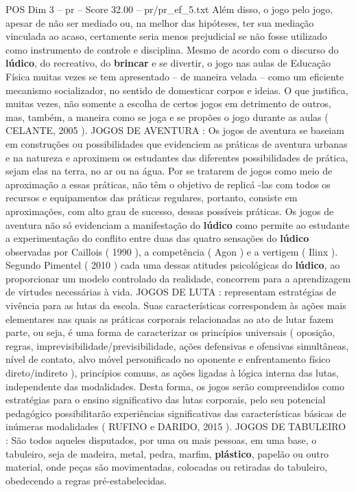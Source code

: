 \begin{textsample}{POS Dim 3 – pr – Score 32.00 – pr/pr\_ef\_5.txt}
Além disso, o jogo pelo jogo, apesar de não ser mediado ou, na melhor das hipóteses, ter sua mediação vinculada ao acaso, certamente seria menos prejudicial se não fosse utilizado como instrumento de controle e disciplina.
Mesmo de acordo com o discurso do \textbf{lúdico}, do recreativo, do \textbf{brincar} e se divertir, o jogo nas aulas de Educação Física muitas vezes se tem apresentado – de maneira velada – como um eficiente mecanismo socializador, no sentido de domesticar corpos e ideias.
O que justifica, muitas vezes, não somente a escolha de certos jogos em detrimento de outros, mas, também, a maneira como se joga e se propões o jogo durante as aulas ( CELANTE, 2005 ).
JOGOS DE AVENTURA : Os jogos de aventura se baseiam em construções ou possibilidades que evidenciem as práticas de aventura urbanas e na natureza e aproximem os estudantes das diferentes possibilidades de prática, sejam elas na terra, no ar ou na água.
Por se tratarem de jogos como meio de aproximação a essas práticas, não têm o objetivo de replicá -las com todos os recursos e equipamentos das práticas regulares, portanto, consiste em aproximações, com alto grau de sucesso, dessas possíveis práticas.
Os jogos de aventura não só evidenciam a manifestação do \textbf{lúdico} como permite ao estudante a experimentação do conflito entre duas das quatro sensações do \textbf{lúdico} observadas por Caillois ( 1990 ), a competência ( Agon ) e a vertigem ( Ilinx ).
Segundo Pimentel ( 2010 ) cada uma dessas atitudes psicológicas do \textbf{lúdico}, ao proporcionar um modelo controlado da realidade, concorrem para a aprendizagem de virtudes necessárias à vida.
JOGOS DE LUTA : representam estratégias de vivência para as lutas da escola.
Suas características correspondem às ações mais elementares nas quais as práticas corporais relacionadas ao ato de lutar fazem parte, ou seja, é uma forma de caracterizar os princípios universais ( oposição, regras, imprevisibilidade/previsibilidade, ações defensivas e ofensivas simultâneas, nível de contato, alvo móvel personificado no oponente e enfrentamento físico direto/indireto ), princípios comuns, as ações ligadas à lógica interna das lutas, independente das modalidades.
Desta forma, os jogos serão compreendidos como estratégias para o ensino significativo das lutas corporais, pelo seu potencial pedagógico possibilitarão experiências significativas das características básicas de inúmeras modalidades ( RUFINO e DARIDO, 2015 ).
JOGOS DE TABULEIRO : São todos aqueles disputados, por uma ou mais pessoas, em uma base, o tabuleiro, seja de madeira, metal, pedra, marfim, \textbf{plástico}, papelão ou outro material, onde peças são movimentadas, colocadas ou retiradas do tabuleiro, obedecendo a regras pré-estabelecidas.

\end{textsample}
